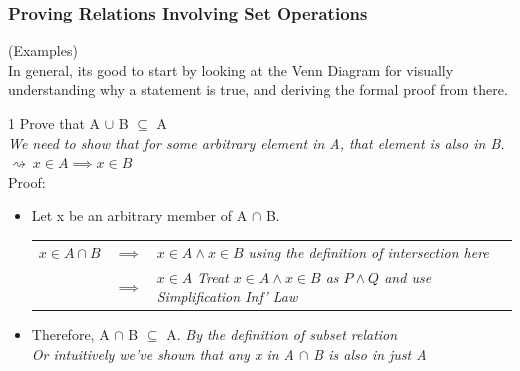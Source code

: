 \documentclass[12pt, letterpaper]{article}
\newcommand{\exheader}[1][ex]{{\tiny{#1}\normalsize}}
\begin{document}
\pagebreak

\subsubsection{Proving Relations Involving Set Operations} 
\vspace*{-0.3cm}
{\small (Examples)} \\
In general, its good to start by looking at the Venn Diagram for visually understanding why a statement is true, and deriving the formal proof from there.

\bigbreak

\exheader[1] Prove that A $\cup$ B $\subseteq$ A \\
{\small \emph{We need to show that for some arbitrary element in A, that element is also in B. \\ $\rightsquigarrow \ x \in A \implies x \in B$ }}
\\ Proof:
\begin{itemize}[leftmargin=*, label={}]
	\item Let x be an arbitrary member of A $\cap$ B. \\
	\begin{tabular}{l l l}
		$x \in A \cap B$ & $\implies$ &  $x \in A \land x \in B$ {\tiny \emph{using the definition of intersection here}} \\
		& $\implies$ & $x \in A$ {\tiny \emph{Treat $x \in A \land x \in B$ as $P \land Q$ and use Simplification Inf' Law}}
	\end{tabular}
	\item Therefore, A $\cap$ B $\subseteq$ A. {\tiny \emph{By the definition of subset relation \\ Or intuitively we've shown that any x in A $\cap$ B is also in just A}}
\end{itemize}

\bigbreak
\end{document}
